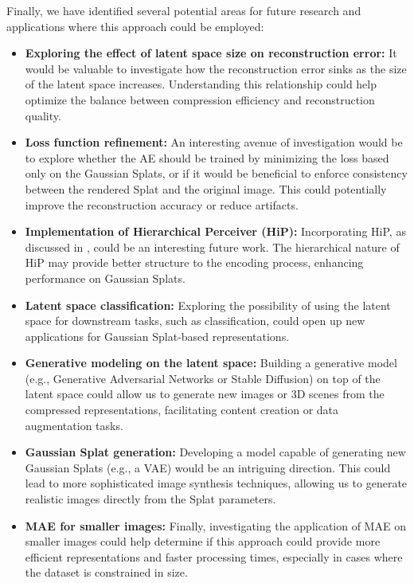Finally, we have identified several potential areas for future research and applications where this approach could be employed:

\begin{itemize}
    \item \textbf{Exploring the effect of latent space size on reconstruction error:} It would be valuable to investigate how the reconstruction error sinks as the size of the latent space increases. Understanding this relationship could help optimize the balance between compression efficiency and reconstruction quality.
    
    \item \textbf{Loss function refinement:} An interesting avenue of investigation would be to explore whether the AE should be trained by minimizing the loss based only on the Gaussian Splats, or if it would be beneficial to enforce consistency between the rendered Splat and the original image. This could potentially improve the reconstruction accuracy or reduce artifacts.
    
    \item \textbf{Implementation of Hierarchical Perceiver (HiP):} Incorporating HiP, as discussed in \cite{carreira2022hierarchicalp}, could be an interesting future work. The hierarchical nature of HiP may provide better structure to the encoding process, enhancing performance on Gaussian Splats.
    
    \item \textbf{Latent space classification:} Exploring the possibility of using the latent space for downstream tasks, such as classification, could open up new applications for Gaussian Splat-based representations.
    
    \item \textbf{Generative modeling on the latent space:} Building a generative model (e.g., Generative Adversarial Networks or Stable Diffusion) on top of the latent space could allow us to generate new images or 3D scenes from the compressed representations, facilitating content creation or data augmentation tasks.
    
    \item \textbf{Gaussian Splat generation:} Developing a model capable of generating new Gaussian Splats (e.g., a VAE) would be an intriguing direction. This could lead to more sophisticated image synthesis techniques, allowing us to generate realistic images directly from the Splat parameters.
    
    \item \textbf{MAE for smaller images:} Finally, investigating the application of MAE on smaller images could help determine if this approach could provide more efficient representations and faster processing times, especially in cases where the dataset is constrained in size.
\end{itemize}
